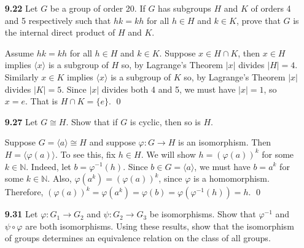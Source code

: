 \documentclass[12pt,reqno]{amsart}
\newcommand{\N}{\ensuremath{\mathbb{N}}}
\newcommand{\<}{\ensuremath{\langle}}
\renewcommand{\>}{\ensuremath{\rangle}}
\renewcommand{\phi}{\ensuremath{\varphi}}
\begin{document}
\begin{enumerate}[{\bf 1.}]

\newpage

\item[{\bf 9.22}]
Let $G$ be a group of order 20. If $G$ has subgroups $H$ and $K$ of
orders 4 and 5 respectively such that $hk = kh$ for all $h \in H$ and
$k \in K$, prove that $G$ is the internal direct product of $H$ and $K$. 

\medskip
{}  
Assume $hk = kh$ for all $h\in H$ and $k\in K$.
Suppose $x \in H\cap K$, then $x \in H$ implies $\<x\>$ is a subgroup of $H$ so,
by Lagrange's Theorem $|x|$ divides $|H| = 4$.
Similarly $x \in K$ implies $\<x\>$ is a subgroup of $K$ so,
by Lagrange's Theorem $|x|$ divides $|K| = 5$. Since $|x|$ divides both 4 and 5,
we must have $|x| = 1$, so $x = e$.  That is $H\cap K = \{e\}$. \qed

\vskip1cm

\item[{\bf 9.27}]
Let $G \cong H$. Show that if $G$ is cyclic, then so is $H$.

\medskip
{} Suppose $G = \<a\> \cong H$ and suppose 
$\varphi: G \rightarrow H$ is an isomorphism.  Then 
$H = \<\varphi(a)\>$.  To see this, fix $h\in H$.  We will show 
$h = (\varphi(a))^k$ for some $k\in \N$. Indeed, let $b = \varphi^{-1}(h)$.
Since $b\in G = \<a\>$, we must have $b = a^k$ for some $k\in \N$.
Also, $\varphi(a^k) = (\varphi(a))^k$, since $\varphi$ is a homomorphism. 
Therefore, $(\varphi(a))^k = \varphi(a^k) = \varphi(b) = \varphi(\varphi^{-1}(h)) = h$.
\qed
\vskip1cm

\item[{\bf 9.31}]
Let $\phi : G_1 \rightarrow G_2$ and  $\psi : G_2 \rightarrow G_3$  be
isomorphisms. Show that  $\phi^{-1}$ and $\psi \circ \phi$ are both
isomorphisms. Using these results, show that the isomorphism of groups
determines an equivalence relation on the class of all groups.


\end{enumerate}
\end{document}
